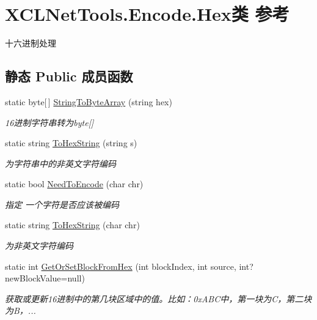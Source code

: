 \hypertarget{class_x_c_l_net_tools_1_1_encode_1_1_hex}{}\section{X\+C\+L\+Net\+Tools.\+Encode.\+Hex类 参考}
\label{class_x_c_l_net_tools_1_1_encode_1_1_hex}


十六进制处理  


\subsection*{静态 Public 成员函数}
\begin{DoxyCompactItemize}
\item 
static byte\mbox{[}$\,$\mbox{]} \hyperlink{class_x_c_l_net_tools_1_1_encode_1_1_hex_a0fb06fdeea06d52883d1f1a93bfcf4e8}{String\+To\+Byte\+Array} (string hex)
\begin{DoxyCompactList}\small\item\em 16进制字符串转为byte\mbox{[}\mbox{]} \end{DoxyCompactList}\item 
static string \hyperlink{class_x_c_l_net_tools_1_1_encode_1_1_hex_a60f888006a88a296a97f8212abd0ddba}{To\+Hex\+String} (string s)
\begin{DoxyCompactList}\small\item\em 为字符串中的非英文字符编码 \end{DoxyCompactList}\item 
static bool \hyperlink{class_x_c_l_net_tools_1_1_encode_1_1_hex_aac3a2883c1182b43cdc0ebd7a5554895}{Need\+To\+Encode} (char chr)
\begin{DoxyCompactList}\small\item\em 指定 一个字符是否应该被编码 \end{DoxyCompactList}\item 
static string \hyperlink{class_x_c_l_net_tools_1_1_encode_1_1_hex_a58fb0c39fe4db08762c074d9d774729d}{To\+Hex\+String} (char chr)
\begin{DoxyCompactList}\small\item\em 为非英文字符编码 \end{DoxyCompactList}\item 
static int \hyperlink{class_x_c_l_net_tools_1_1_encode_1_1_hex_abe9191a3f762b84c077bba6ef4f6dc30}{Get\+Or\+Set\+Block\+From\+Hex} (int block\+Index, int source, int?new\+Block\+Value=null)
\begin{DoxyCompactList}\small\item\em 获取或更新16进制中的第几块区域中的值。比如：0x\+A\+B\+C中，第一块为\+C，第二块为\+B，... \end{DoxyCompactList}\end{DoxyCompactItemize}


